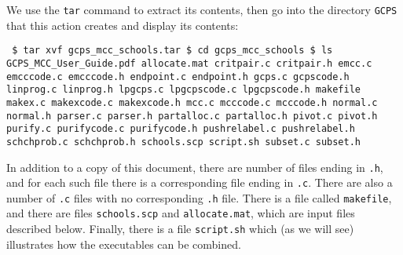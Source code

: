 \documentclass[12pt]{article}
\theoremstyle{definition}
\begin{document}
We use the \texttt{tar} command to extract its contents, then go into
the directory \texttt{GCPS} that this action creates and display its
contents:
\begin{obeylines}
  \texttt{
    \$ tar xvf gcps\_mcc\_schools.tar
    \$ cd gcps\_mcc\_schools
    \$ ls
GCPS\_MCC\_User\_Guide.pdf allocate.mat critpair.c critpair.h              
emcc.c emcccode.c emcccode.h endpoint.c
endpoint.h gcps.c gcpscode.h linprog.c
linprog.h lpgcps.c lpgcpscode.c lpgcpscode.h
makefile makex.c makexcode.c makexcode.h
mcc.c mcccode.c mcccode.h normal.c
normal.h parser.c parser.h partalloc.c
partalloc.h pivot.c pivot.h purify.c
purifycode.c purifycode.h pushrelabel.c pushrelabel.h
schchprob.c schchprob.h schools.scp script.sh
subset.c subset.h
    }
\end{obeylines}
\bigskip
In addition to a copy of this document, there are number of files
ending in \texttt{.h}, and for each such file there is a corresponding
file ending in \texttt{.c}.  There are also a number of \texttt{.c}
files with no corresponding \texttt{.h} file.  There is a file called
\texttt{makefile}, and there are files \texttt{schools.scp} and
\texttt{allocate.mat}, which are input files described below.
Finally, there is a file \texttt{script.sh} which (as we will see)
illustrates how the executables can be combined.
\end{document}
